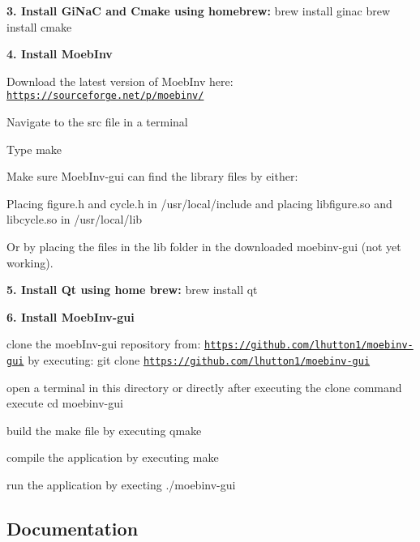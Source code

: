 {\bfseries 3. Install Gi\+NaC and Cmake using homebrew\+:} {\ttfamily brew install ginac brew install cmake}

{\bfseries 4. Install Moeb\+Inv}


\begin{DoxyItemize}
\item Download the latest version of Moeb\+Inv here\+: \href{https://sourceforge.net/p/moebinv/}{\tt https\+://sourceforge.\+net/p/moebinv/}
\item Navigate to the src file in a terminal
\item Type {\ttfamily make}
\item Make sure Moeb\+Inv-\/gui can find the library files by either\+:
\begin{DoxyItemize}
\item Placing {\ttfamily figure.\+h} and {\ttfamily cycle.\+h} in {\ttfamily /usr/local/include} and placing {\ttfamily libfigure.\+so} and {\ttfamily libcycle.\+so} in {\ttfamily /usr/local/lib}
\item Or by placing the files in the lib folder in the downloaded moebinv-\/gui (not yet working).
\end{DoxyItemize}
\end{DoxyItemize}

{\bfseries 5. Install Qt using home brew\+:} {\ttfamily brew install qt}

{\bfseries 6. Install Moeb\+Inv-\/gui}
\begin{DoxyItemize}
\item clone the moeb\+Inv-\/gui repository from\+: \href{https://github.com/lhutton1/moebinv-gui}{\tt https\+://github.\+com/lhutton1/moebinv-\/gui} by executing\+: {\ttfamily git clone \href{https://github.com/lhutton1/moebinv-gui}{\tt https\+://github.\+com/lhutton1/moebinv-\/gui}}
\item open a terminal in this directory or directly after executing the clone command execute {\ttfamily cd moebinv-\/gui}
\item build the make file by executing {\ttfamily qmake}
\item compile the application by executing {\ttfamily make}
\item run the application by execting {\ttfamily ./moebinv-\/gui}
\end{DoxyItemize}

\subsection*{Documentation}

